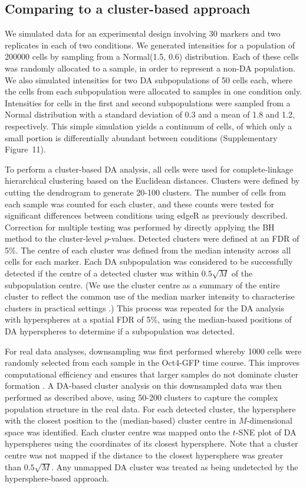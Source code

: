 \documentclass{article}
\newcommand{\suppfigclustersim}{11}
\begin{document}
\subsection{Comparing to a cluster-based approach}
We simulated data for an experimental design involving 30 markers and two replicates in each of two conditions.
We generated intensities for a population of 200000 cells by sampling from a Normal(1.5, 0.6) distribution.
Each of these cells was randomly allocated to a sample, in order to represent a non-DA population.
We also simulated intensities for two DA subpopulations of 50 cells each, where the cells from each subpopulation were allocated to samples in one condition only.
Intensities for cells in the first and second subpopulations were sampled from a Normal distribution with a standard deviation of 0.3 and a mean of 1.8 and 1.2, respectively.
This simple simulation yields a continuum of cells, of which only a small portion is differentially abundant between conditions (Supplementary Figure~\suppfigclustersim{}).

To perform a cluster-based DA analysis, all cells were used for complete-linkage hierarchical clustering based on the Euclidean distances.
Clusters were defined by cutting the dendrogram to generate 20-100 clusters.
The number of cells from each sample was counted for each cluster, and these counts were tested for significant differences between conditions using edgeR as previously described.
Correction for multiple testing was performed by directly applying the BH method to the cluster-level $p$-values.
Detected clusters were defined at an FDR of 5\%.
The centre of each cluster was defined from the median intensity across all cells for each marker.
Each DA subpopulation was considered to be successfully detected if the centre of a detected cluster was within $0.5\sqrt{M}$ of the subpopulation centre.
(We use the cluster centre as a summary of the entire cluster to reflect the common use of the median marker intensity to characterise clusters in practical settings \cite{qiu2011extracting,bruggner2014automated}.)
This process was repeated for the DA analysis with hyperspheres at a spatial FDR of 5\%, using the median-based positions of DA hyperspheres to determine if a subpopulation was detected.

For real data analyses, downsampling was first performed whereby 1000 cells were randomly selected from each sample in the Oct4-GFP time course.
This improves computational efficiency and ensures that larger samples do not dominate cluster formation \cite{bruggner2014automated}.
A DA-based cluster analysis on this downsampled data was then performed as described above, using 50-200 clusters to capture the complex population structure in the real data.
For each detected cluster, the hypersphere with the closest position to the (median-based) cluster centre in $M$-dimensional space was identified.
Each cluster centre was mapped onto the $t$-SNE plot of DA hyperspheres using the coordinates of its closest hypersphere.
Note that a cluster centre was not mapped if the distance to the closest hypersphere was greater than $0.5\sqrt{M}$.
Any unmapped DA cluster was treated as being undetected by the hypersphere-based approach.
\end{document}
